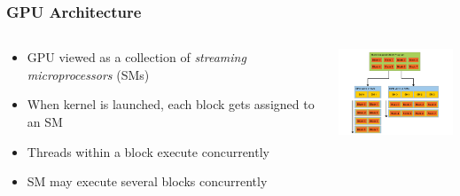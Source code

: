 \begin{frame}
\frametitle{GPU Architecture}
\begin{columns}
\begin{column}{0.5\textwidth}
\begin{itemize}
\item GPU viewed as a collection of \emph{streaming microprocessors} (SMs)
\item When kernel is launched, each block gets assigned to an SM
\item Threads within a block execute concurrently
\item SM may execute several blocks concurrently
\end{itemize}
\end{column}
\begin{column}{0.5\textwidth}
\includegraphics[width=150px]{img/gpu-scaling.png}
\end{column}
\end{columns}
\end{frame}

